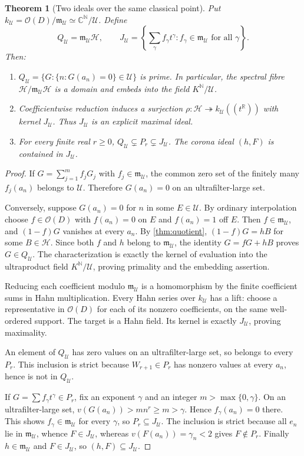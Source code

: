 \documentclass[11pt,letterpaper]{article}
\numberwithin{equation}{section}
\newtheorem{theorem}{Theorem}[section]
\theoremstyle{definition}
\theoremstyle{remark}
\newcommand{\C}{\mathbb C}
\newcommand{\R}{\mathbb R}
\newcommand{\N}{\mathbb N}
\newcommand{\OO}{\mathcal O}
\newcommand{\HH}{\mathcal H}
\newcommand{\UU}{\mathcal U}
\newcommand{\mm}{\mathfrak m}
\begin{document}
\begin{theorem}[Two ideals over the same classical point]
\label{thm:two-ideals}
Put $k_\UU=\OO(D)/\mm_\UU\simeq\C^\N/\UU$. Define
\[
 Q_\UU=\mm_\UU\HH,\qquad
 J_\UU=\left\{\sum_\gamma f_\gamma t^\gamma:
                           f_\gamma\in\mm_\UU\text{ for all }\gamma\right\}.
\]
Then:
\begin{enumerate}
\item $Q_\UU=\{G:\{n:G(a_n)=0\}\in\UU\}$ is prime. In particular,
      the spectral fibre $\HH/\mm_\UU\HH$ is a domain and embeds into
      the field $K^\N/\UU$.
\item Coefficientwise reduction induces a surjection
      $\rho:\HH\twoheadrightarrow k_\UU((t^\R))$ with kernel $J_\UU$.
      Thus $J_\UU$ is an explicit maximal ideal.
\item For every finite real $r\ge0$,
      $Q_\UU\subsetneq P_r\subsetneq J_\UU$.
      The corona ideal $(h,F)$ is contained in $J_\UU$.
\end{enumerate}
\end{theorem}
\begin{proof}
If $G=\sum_{j=1}^m f_jG_j$ with $f_j\in\mm_\UU$, the common zero set
of the finitely many $f_j(a_n)$ belongs to $\UU$. Therefore
$G(a_n)=0$ on an ultrafilter-large set.

Conversely, suppose $G(a_n)=0$ for $n$ in some $E\in\UU$.
By ordinary interpolation choose $f\in\OO(D)$ with $f(a_n)=0$ on $E$
and $f(a_n)=1$ off $E$. Then $f\in\mm_\UU$, and $(1-f)G$ vanishes at
every $a_n$. By \cref{thm:quotient}, $(1-f)G=hB$ for some $B\in\HH$.
Since both $f$ and $h$ belong to $\mm_\UU$, the identity
$G=fG+hB$ proves $G\in Q_\UU$. The characterization is exactly the
kernel of evaluation into the ultraproduct field $K^\N/\UU$, proving
primality and the embedding assertion.

Reducing each coefficient modulo $\mm_\UU$ is a homomorphism by the
finite coefficient sums in Hahn multiplication. Every Hahn series over
$k_\UU$ has a lift: choose a representative in $\OO(D)$ for each of its
nonzero coefficients, on the same well-ordered support. The target is
a Hahn field. Its kernel is exactly $J_\UU$, proving maximality.

An element of $Q_\UU$ has zero values on an ultrafilter-large set, so
belongs to every $P_r$. This inclusion is strict because
$W_{r+1}\in P_r$ has nonzero values at every $a_n$, hence is not in
$Q_\UU$.

If $G=\sum f_\gamma t^\gamma\in P_r$, fix an exponent $\gamma$ and an
integer $m>\max\{0,\gamma\}$. On an ultrafilter-large set,
$v(G(a_n))>mn^r\ge m>\gamma$. Hence $f_\gamma(a_n)=0$ there. This shows
$f_\gamma\in\mm_\UU$ for every $\gamma$, so $P_r\subseteq J_\UU$.
The inclusion is strict because all $e_n$ lie in $\mm_\UU$, whence
$F\in J_\UU$, whereas $v(F(a_n))=\gamma_n<2$ gives $F\notin P_r$.
Finally $h\in\mm_\UU$ and $F\in J_\UU$, so $(h,F)\subseteq J_\UU$.
\end{proof}
\end{document}
